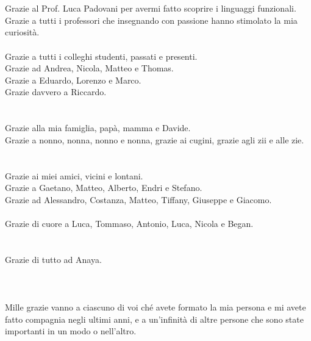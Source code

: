 \chapter*{}
\label{chap:8-thanks}

Grazie al Prof. Luca Padovani per avermi fatto scoprire i linguaggi funzionali. \\
Grazie a tutti i professori che insegnando con passione hanno stimolato la mia curiosità. \\
\\
Grazie a tutti i colleghi studenti, passati e presenti. \\
Grazie ad Andrea, Nicola, Matteo e Thomas. \\
Grazie a Eduardo, Lorenzo e Marco. \\
Grazie davvero a Riccardo. \\
\\
\\
Grazie alla mia famiglia, papà, mamma e Davide. \\
Grazie a nonno, nonna, nonno e nonna, grazie ai cugini, grazie agli zii e alle zie. \\
\\
\\
Grazie ai miei amici, vicini e lontani. \\
Grazie a Gaetano, Matteo, Alberto, Endri e Stefano. \\
Grazie ad Alessandro, Costanza, Matteo, Tiffany, Giuseppe e Giacomo. \\
\\
Grazie di cuore a Luca, Tommaso, Antonio, Luca, Nicola e Began. \\
\\
\\
Grazie di tutto ad Anaya.
\\
\\
\\
\\
Mille grazie vanno a ciascuno di voi ché avete formato la mia persona e mi avete fatto compagnia
negli ultimi anni, e a un'infinità di altre persone che sono state importanti in un modo o nell'altro.